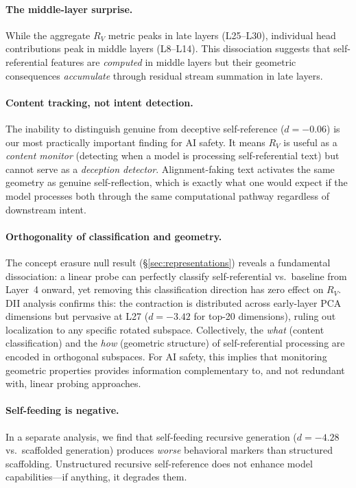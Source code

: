 \documentclass{article}
\newcommand{\RV}{R_V}
\newcommand{\dcohen}{d}
\begin{document}
\paragraph{The middle-layer surprise.}
While the aggregate $\RV$ metric peaks in late layers (L25--L30), individual head contributions peak in middle layers (L8--L14).
This dissociation suggests that self-referential features are \emph{computed} in middle layers but their geometric consequences \emph{accumulate} through residual stream summation in late layers.

\paragraph{Content tracking, not intent detection.}
The inability to distinguish genuine from deceptive self-reference ($\dcohen{=}{-}0.06$) is our most practically important finding for AI safety.
It means $\RV$ is useful as a \emph{content monitor} (detecting when a model is processing self-referential text) but cannot serve as a \emph{deception detector}.
Alignment-faking text activates the same geometry as genuine self-reflection, which is exactly what one would expect if the model processes both through the same computational pathway regardless of downstream intent.

\paragraph{Orthogonality of classification and geometry.}
The concept erasure null result (\S\ref{sec:representations}) reveals a fundamental dissociation: a linear probe can perfectly classify self-referential vs.\ baseline from Layer~4 onward, yet removing this classification direction has zero effect on $\RV$.
DII analysis confirms this: the contraction is distributed across early-layer PCA dimensions but pervasive at L27 ($\dcohen{=}{-}3.42$ for top-20 dimensions), ruling out localization to any specific rotated subspace.
Collectively, the \emph{what} (content classification) and the \emph{how} (geometric structure) of self-referential processing are encoded in orthogonal subspaces.
For AI safety, this implies that monitoring geometric properties provides information complementary to, and not redundant with, linear probing approaches.

\paragraph{Self-feeding is negative.}
In a separate analysis, we find that self-feeding recursive generation ($\dcohen{=}{-}4.28$ vs.\ scaffolded generation) produces \emph{worse} behavioral markers than structured scaffolding.
Unstructured recursive self-reference does not enhance model capabilities---if anything, it degrades them.
\end{document}
